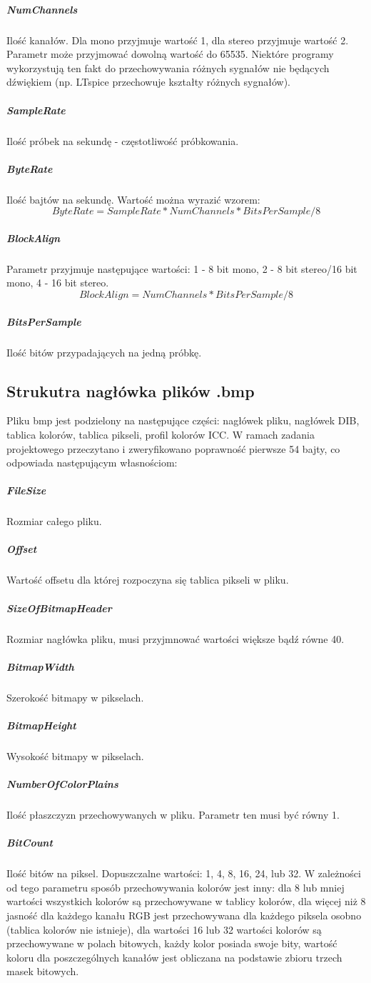 \documentclass{article}
\begin{document}
\subparagraph{NumChannels}
Ilość kanałów. Dla mono przyjmuje wartość 1, dla stereo przyjmuje wartość 2. Parametr może przyjmować dowolną wartość do 65535. Niektóre programy wykorzystują ten fakt do przechowywania różnych sygnałów nie będących dźwiękiem (np. LTspice przechowuje kształty różnych sygnałów).

\subparagraph{SampleRate}
Ilość próbek na sekundę - częstotliwość próbkowania.

\subparagraph{ByteRate}
Ilość bajtów na sekundę. Wartość można wyrazić wzorem:
\begin{equation}
ByteRate = SampleRate * NumChannels * BitsPerSample/8
\end{equation}

\subparagraph{BlockAlign}
Parametr przyjmuje następujące wartości: 1 - 8 bit mono, 2 - 8 bit stereo/16 bit mono, 4 - 16 bit stereo.
\begin{equation}
BlockAlign = NumChannels * BitsPerSample/8
\end{equation}

\subparagraph{BitsPerSample}
Ilość bitów przypadających na jedną próbkę.


\subsection{Strukutra nagłówka plików .bmp}

Pliku bmp jest podzielony na następujące części: nagłówek pliku, nagłówek DIB, tablica kolorów, tablica pikseli, profil kolorów ICC. W ramach zadania projektowego przeczytano i zweryfikowano poprawność pierwsze 54 bajty, co odpowiada następującym własnościom:

\subparagraph{FileSize}
Rozmiar całego pliku.

\subparagraph{Offset}
Wartość offsetu dla której rozpoczyna się tablica pikseli w pliku.

\subparagraph{SizeOfBitmapHeader}
Rozmiar nagłówka pliku, musi przyjmnować wartości większe bądź równe 40.

\subparagraph{BitmapWidth}
Szerokość bitmapy w pikselach.

\subparagraph{BitmapHeight}
Wysokość bitmapy w pikselach.

\subparagraph{NumberOfColorPlains}
Ilość płaszczyzn przechowywanych w pliku. Parametr ten musi być równy 1.

\subparagraph{BitCount}
Ilość bitów na piksel. Dopuszczalne wartości: 1, 4, 8, 16, 24, lub 32. W zależności od tego parametru sposób przechowywania kolorów jest inny: dla 8 lub mniej wartości wszystkich kolorów są przechowywane w tablicy kolorów, dla więcej niż 8 jasność dla każdego kanału RGB jest przechowywana dla każdego piksela osobno (tablica kolorów nie istnieje), dla wartości 16 lub 32 wartości kolorów są przechowywane w polach bitowych, każdy kolor posiada swoje bity, wartość koloru dla poszczególnych kanałów jest obliczana na podstawie zbioru trzech masek bitowych.
\end{document}
